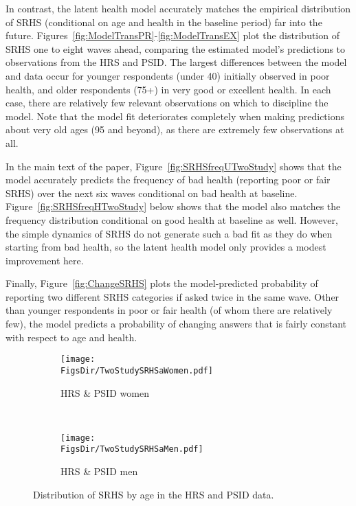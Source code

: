 \documentclass[12pt,pdftex,letterpaper]{article}
\newcommand{\RootDir}{..}
\newcommand{\FigsDir}{\RootDir/Figures}
\begin{document}
In contrast, the latent health model accurately matches the empirical distribution of SRHS (conditional on age and health in the baseline period) far into the future. Figures~\ref{fig:ModelTransPR}-\ref{fig:ModelTransEX} plot the distribution of SRHS one to eight waves ahead, comparing the estimated model's predictions to observations from the HRS and PSID. The largest differences between the model and data occur for younger respondents (under 40) initially observed in poor health, and older respondents (75+) in very good or excellent health. In each case, there are relatively few relevant observations on which to discipline the model. Note that the model fit deteriorates completely when making predictions about very old ages (95 and beyond), as there are extremely few observations at all.

In the main text of the paper, Figure~\ref{fig:SRHSfreqUTwoStudy} shows that the model accurately predicts the frequency of bad health (reporting poor or fair SRHS) over the next six waves conditional on bad health at baseline. Figure~\ref{fig:SRHSfreqHTwoStudy} below shows that the model also matches the frequency distribution conditional on good health at baseline as well. However, the simple dynamics of SRHS do not generate such a bad fit as they do when starting from bad health, so the latent health model only provides a modest improvement here.

Finally, Figure~\ref{fig:ChangeSRHS} plots the model-predicted probability of reporting two different SRHS categories if asked twice in the same wave. Other than younger respondents in poor or fair health (of whom there are relatively few), the model predicts a probability of changing answers that is fairly constant with respect to age and health.

\begin{figure}
	\centering
	\begin{subfigure}[b]{0.48\textwidth}
		\texttt{[image: \\FigsDir/TwoStudySRHSaWomen.pdf]}
		\caption{HRS \& PSID women}\label{fig:SRHScompareWomen}
	\end{subfigure}
	~
	\begin{subfigure}[b]{0.48\textwidth}
		\texttt{[image: \\FigsDir/TwoStudySRHSaMen.pdf]}
		\caption{HRS \& PSID men}\label{fig:SRHScompareMen}
	\end{subfigure}
	\caption{Distribution of SRHS by age in the HRS and PSID data.}\label{fig:SRHScompare}
\end{figure}
\end{document}
